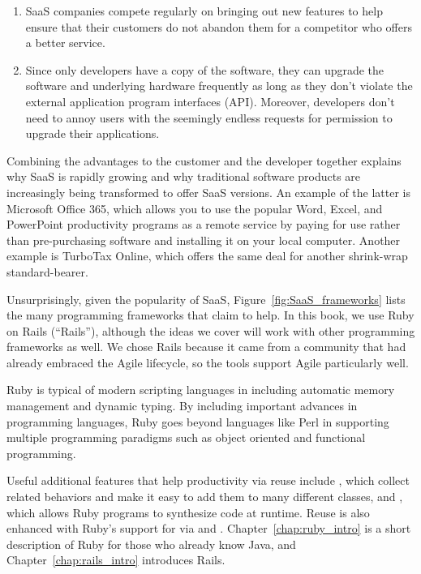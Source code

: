 \begin{enumerate}
\item SaaS companies compete regularly on bringing out new features to help ensure that their customers do not abandon them for a competitor who offers a better service.

\item Since only developers have a copy of the software, they can upgrade the software and underlying hardware frequently as long as they don't violate the external application program interfaces (API). Moreover, developers don't need to annoy users with the seemingly endless requests for permission to upgrade their applications.

\end{enumerate}

Combining the advantages to the customer and the developer together
explains why SaaS is rapidly growing and why traditional software
products are increasingly being transformed to offer SaaS versions. An
example of the latter is Microsoft Office 365, which allows you to use
the popular Word, Excel, and PowerPoint productivity programs as a
remote service by paying for use rather than pre-purchasing software and
installing it on your local computer.
Another example is TurboTax
Online, which offers the same deal for another shrink-wrap
standard-bearer.



Unsurprisingly, given the popularity of SaaS,
Figure~\ref{fig:SaaS_frameworks} lists the many programming frameworks that claim to help.   In this book, we use Ruby on Rails (``Rails''), although the ideas we cover will work with other programming frameworks as well. We chose Rails because it came from a community that had already embraced the Agile lifecycle, so the tools support Agile particularly well.

Ruby is typical of modern scripting languages in including automatic memory management and dynamic typing. By including important advances in programming languages, Ruby goes beyond languages like Perl in supporting multiple programming paradigms such as object oriented and functional programming.


Useful additional features that help productivity via reuse include ,
which collect related behaviors and make it easy to add them to many different classes,
and ,
which allows Ruby programs to synthesize code at runtime.
Reuse is also enhanced with Ruby's support for  via  and . Chapter~\ref{chap:ruby_intro} is a short description of Ruby for those who already know Java, and Chapter~\ref{chap:rails_intro} introduces Rails.

